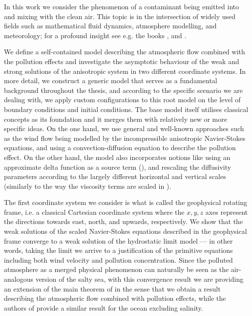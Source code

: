 \documentclass[12pt]{report}
\numberwithin{theorem}{chapter}
\numberwithin{corollary}{chapter}
\numberwithin{lemma}{chapter}
\numberwithin{remark}{chapter}
\numberwithin{definition}{chapter}
\numberwithin{prop}{chapter}
\begin{document}
In this work we consider the phenomenon of a contaminant being emitted into and mixing with the clean air. This topic is in the intersection of widely used fields such as mathematical fluid dynamics, atmosphere modelling, and meteorology; for a profound insight see e.g. the books \cite{arya2001introduction}, \cite{pedlosky2013geophysical} and \cite{temam2001navier}.

We define a self-contained model describing the atmospheric flow combined with the pollution effects and investigate the asymptotic behaviour of the weak and strong solutions of the anisotropic system in two different coordinate systems. In more detail, we construct a generic model that serves as a fundamental background throughout the thesis, and according to the specific scenario we are dealing with, we apply custom configurations to this root model on the level of boundary conditions and initial conditions. The base model itself utilises classical concepts as its foundation and it merges them with relatively new or more specific ideas. On the one hand, we use general and well-known approaches such as the wind flow being modelled by the incompressible anisotropic Navier-Stokes equations, and using a convection-diffusion equation to describe the pollution effect. On the other hand, the model also incorporates notions like using an approximate delta function as a source term (\cite{zhuk2016source}), and rescaling the diffusivity parameters according to the largely different horizontal and vertical scales (similarly to the way the viscosity terms are scaled in \cite{azerad2001mathematical}).

The first coordinate system we consider is what is called the geophysical rotating frame, i.e. a classical Cartesian coordinate system where the $x, y, z$ axes represent the directions towards east, north, and upwards, respectively. We show that the weak solutions of the scaled Navier-Stokes equations described in the geophysical frame converge to a weak solution of the hydrostatic limit model --- in other words, taking the limit we arrive to a justification of the primitive equations including both wind velocity and pollution concentration. Since the polluted atmosphere as a merged physical phenomenon can naturally be seen as the air-analogous version of the salty sea, with this convergence result we are providing an extension of the main theorem of \cite{azerad2001mathematical} in the sense that we obtain a result describing the atmospheric flow combined with pollution effects, while the authors of \cite{azerad2001mathematical} provide a similar result for the ocean excluding salinity.
\end{document}
